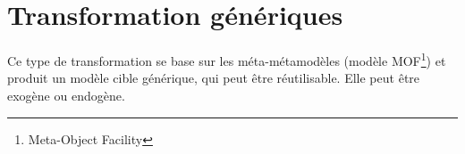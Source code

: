 \section{Transformation g{\'e}n{\'e}riques}
Ce type de transformation se base sur les m{\'e}ta-m{\'e}tamod{\`e}les (mod{\`e}le MOF\protect\footnote{Meta-Object Facility}) et produit un mod{\`e}le cible g{\'e}n{\'e}rique, qui peut {\^e}tre r{\'e}utilisable. Elle peut {\^e}tre exog{\`e}ne ou endog{\`e}ne.
